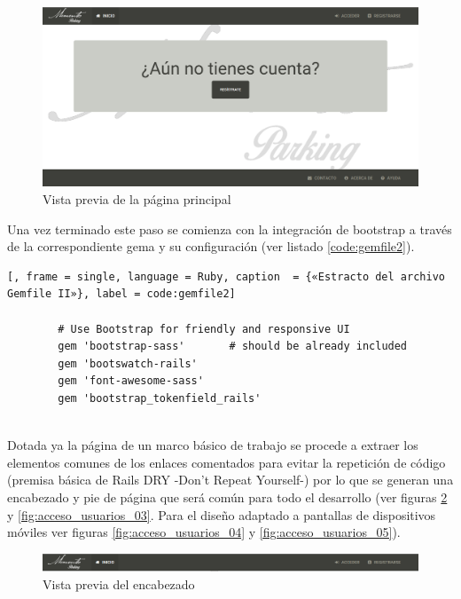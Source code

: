 	\begin{figure}[H]
		\centering
		\includegraphics[width=15cm, fbox={\fboxrule} 4mm]{images/05-resultados/04-acceso_usuarios_1.png}
		\caption{Vista previa de la página principal}
		\label{fig:acceso_usuarios_01}
	\end{figure}

	Una vez terminado este paso se comienza con la integración de bootstrap a través de la correspondiente gema y su configuración (ver listado \ref{code:gemfile2}).\\

	\begin{lstlisting}[, frame = single, language = Ruby, caption  = {«Estracto del archivo Gemfile II»}, label = code:gemfile2]
		
		# Use Bootstrap for friendly and responsive UI
		gem 'bootstrap-sass'       # should be already included
		gem 'bootswatch-rails'
		gem 'font-awesome-sass'
		gem 'bootstrap_tokenfield_rails'
		
	\end{lstlisting}
		
	Dotada ya la página de un marco básico de trabajo se procede a extraer los elementos comunes de los enlaces comentados para evitar la repetición de código (premisa básica de Rails DRY -Don't Repeat Yourself-) por lo que se generan una encabezado y pie de página que será común para todo el desarrollo (ver figuras \ref{fig:acceso_usuarios_02} y \ref{fig:acceso_usuarios_03}. Para el diseño adaptado a pantallas de dispositivos móviles ver figuras \ref{fig:acceso_usuarios_04} y \ref{fig:acceso_usuarios_05}). 
	
	\begin{figure}[H]
		\centering
		\includegraphics[width=15cm, fbox={\fboxrule} 4mm]{images/05-resultados/05-acceso_usuarios_2.png}
		\caption{Vista previa del encabezado}
		\label{fig:acceso_usuarios_02}
	\end{figure}
	

